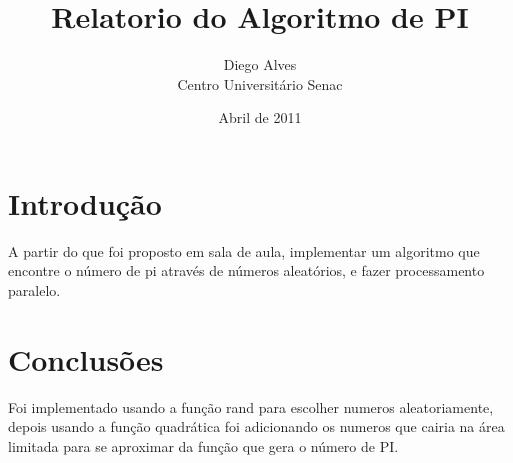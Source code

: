 \documentclass[a4paper,12pt]{article}
\title{Relatorio do Algoritmo de PI}
\author{Diego Alves\\Centro Universitário Senac}
\date{Abril de 2011}
\begin{document}
    \maketitle

    \section{Introdução}

        A partir do que foi proposto em sala de aula, implementar um algoritmo que encontre o número de pi através de números aleatórios, e fazer processamento paralelo.

    \section{Conclusões}
	
        Foi implementado usando a função rand para escolher numeros aleatoriamente, depois usando a função quadrática foi adicionando os numeros que cairia na área limitada para se aproximar da função que gera o número de PI.
\end{document}
